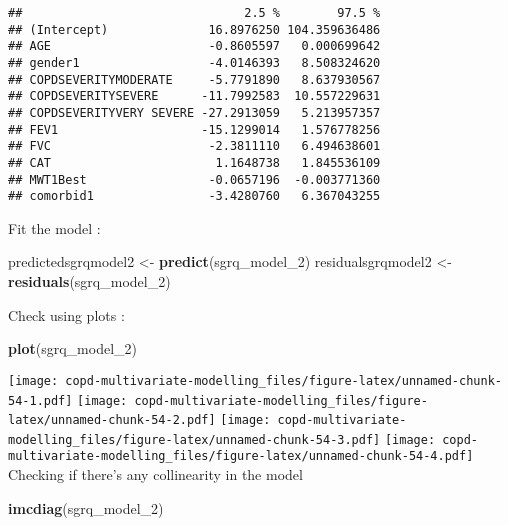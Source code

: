 \documentclass[
]{article}
\newenvironment{Shaded}{\begin{snugshade}}{\end{snugshade}}
\newcommand{\FunctionTok}[1]{\textcolor[rgb]{0.13,0.29,0.53}{\textbf{#1}}}
\newcommand{\NormalTok}[1]{#1}
\newcommand{\OtherTok}[1]{\textcolor[rgb]{0.56,0.35,0.01}{#1}}
\begin{document}
\begin{verbatim}
##                               2.5 %        97.5 %
## (Intercept)              16.8976250 104.359636486
## AGE                      -0.8605597   0.000699642
## gender1                  -4.0146393   8.508324620
## COPDSEVERITYMODERATE     -5.7791890   8.637930567
## COPDSEVERITYSEVERE      -11.7992583  10.557229631
## COPDSEVERITYVERY SEVERE -27.2913059   5.213957357
## FEV1                    -15.1299014   1.576778256
## FVC                      -2.3811110   6.494638601
## CAT                       1.1648738   1.845536109
## MWT1Best                 -0.0657196  -0.003771360
## comorbid1                -3.4280760   6.367043255
\end{verbatim}

Fit the model :

\begin{Shaded}
\begin{Highlighting}[]
\NormalTok{predictedsgrqmodel2 }\OtherTok{\textless{}{-}} \FunctionTok{predict}\NormalTok{(sgrq\_model\_2)}
\NormalTok{residualsgrqmodel2 }\OtherTok{\textless{}{-}} \FunctionTok{residuals}\NormalTok{(sgrq\_model\_2)}
\end{Highlighting}
\end{Shaded}

Check using plots :

\begin{Shaded}
\begin{Highlighting}[]
\FunctionTok{plot}\NormalTok{(sgrq\_model\_2)}
\end{Highlighting}
\end{Shaded}

\texttt{[image: copd-multivariate-modelling\_files/figure-latex/unnamed-chunk-54-1.pdf]}
\texttt{[image: copd-multivariate-modelling\_files/figure-latex/unnamed-chunk-54-2.pdf]}
\texttt{[image: copd-multivariate-modelling\_files/figure-latex/unnamed-chunk-54-3.pdf]}
\texttt{[image: copd-multivariate-modelling\_files/figure-latex/unnamed-chunk-54-4.pdf]}
Checking if there's any collinearity in the model

\begin{Shaded}
\begin{Highlighting}[]
\FunctionTok{imcdiag}\NormalTok{(sgrq\_model\_2)}
\end{Highlighting}
\end{Shaded}
\end{document}
